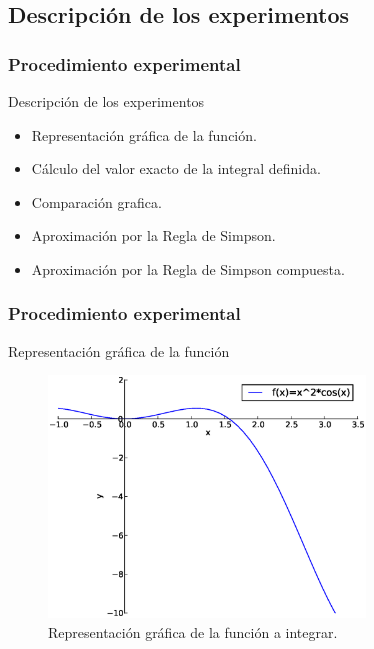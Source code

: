\documentclass{beamer}
\begin{document}
\subsection{Descripción de los experimentos}

\begin{frame}
\frametitle{Procedimiento experimental}

\begin{block}{Descripción de los experimentos}
  \begin{itemize}
    \item <1-> Representación gráfica de la función.
    \pause
    \item <2-> Cálculo del valor exacto de la integral definida.
    \pause  
    \item <3-> Comparación grafica.
    \pause
    \item <4-> Aproximación por la Regla de Simpson.
    \pause
    \item <5-> Aproximación por la Regla de Simpson compuesta.
    
  \end{itemize}
\end{block}

\end{frame}

\begin{frame}
\frametitle{Procedimiento experimental}
  \begin{block}{Representación gráfica de la función}
  \begin{figure}[ht]
   \centering
   \includegraphics[width=0.75\textwidth]{img/grafica1.eps}
   \caption{Representación gráfica de la función a integrar.}
   \end{figure}
   \end{block}

\end{frame}
\end{document}
